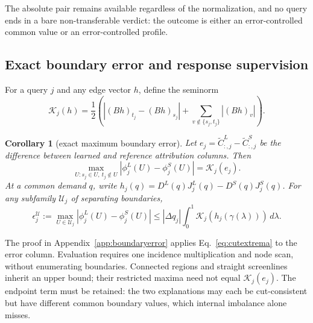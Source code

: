 \documentclass[a4paper,fleqn]{cas-sc}
\newtheorem{corollary}[theorem]{Corollary}
\begin{document}
\medskip
\noindent{}
\medskip

\noindent The absolute pair remains available regardless of the
normalization, and no query ends in a bare non-transferable verdict:
the outcome is either an error-controlled common value or an
error-controlled profile.



\subsection{Exact boundary error and response supervision}\label{sec:boundarylearning}
For a query $j$ and any edge vector $h$, define the seminorm
\begin{equation}
\mathcal K_j(h)=\frac12\left(\left|(Bh)_{t_j}-(Bh)_{s_j}\right|
+\sum_{v\notin\{s_j,t_j\}}|(Bh)_v|\right).
\label{eq:boundaryseminorm}
\end{equation}
\begin{corollary}[exact maximum boundary error]\label{cor:boundaryerror}
Let $e_j=\widetilde C^L_{:,j}-\widetilde C^S_{:,j}$ be the difference
between learned and reference attribution columns. Then
\begin{equation}
\max_{U:s_j\in U,\ t_j\notin U}|\phi_j^L(U)-\phi_j^S(U)|
=\mathcal K_j(e_j).\label{eq:exactboundaryerror}
\end{equation}
At a common demand $q$, write
$h_j(q)=D^L(q)J_j^L(q)-D^S(q)J_j^S(q)$.
For any subfamily $\mathcal U_j$ of separating boundaries,
\begin{equation}
\epsilon_j^{\mathcal U}:=\max_{U\in\mathcal U_j}|\phi_j^L(U)-\phi_j^S(U)|
\le |\Delta q_j|\int_0^1\mathcal K_j(h_j(\gamma(\lambda)))\,d\lambda.
\label{eq:localboundarybound}
\end{equation}
\end{corollary}
The proof in Appendix~\ref{app:boundaryerror} applies
Eq.~\eqref{eq:cutextrema} to the error column. Evaluation requires one
incidence multiplication and node scan, without enumerating boundaries.
Connected regions and straight screenlines inherit an upper bound; their
restricted maxima need not equal $\mathcal K_j(e_j)$. The endpoint term
must be retained: the two explanations may each be cut-consistent but
have different common boundary values, which internal imbalance alone misses.
\end{document}

